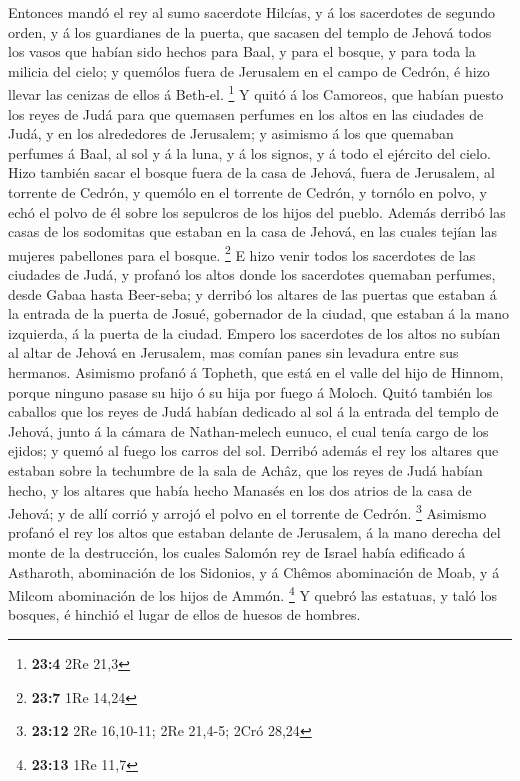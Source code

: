  Entonces mandó el rey al sumo sacerdote Hilcías, y á los
sacerdotes de segundo orden, y á los guardianes de la puerta, que
sacasen del templo de Jehová todos los vasos que habían sido hechos para
Baal, y para el bosque, y para toda la milicia del cielo; y quemólos
fuera de Jerusalem en el campo de Cedrón, é hizo llevar las cenizas de
ellos á Beth-el. \footnote{\textbf{23:4} 2Re 21,3}  Y
quitó á los Camoreos, que habían puesto los reyes de Judá para que
quemasen perfumes en los altos en las ciudades de Judá, y en los
alrededores de Jerusalem; y asimismo á los que quemaban perfumes á Baal,
al sol y á la luna, y á los signos, y á todo el ejército del cielo.
 Hizo también sacar el bosque fuera de la casa de Jehová,
fuera de Jerusalem, al torrente de Cedrón, y quemólo en el torrente de
Cedrón, y tornólo en polvo, y echó el polvo de él sobre los sepulcros de
los hijos del pueblo.  Además derribó las casas de los
sodomitas que estaban en la casa de Jehová, en las cuales tejían las
mujeres pabellones para el bosque. \footnote{\textbf{23:7} 1Re 14,24}
 E hizo venir todos los sacerdotes de las ciudades de
Judá, y profanó los altos donde los sacerdotes quemaban perfumes, desde
Gabaa hasta Beer-seba; y derribó los altares de las puertas que estaban
á la entrada de la puerta de Josué, gobernador de la ciudad, que estaban
á la mano izquierda, á la puerta de la ciudad.  Empero los
sacerdotes de los altos no subían al altar de Jehová en Jerusalem, mas
comían panes sin levadura entre sus hermanos.  Asimismo
profanó á Topheth, que está en el valle del hijo de Hinnom, porque
ninguno pasase su hijo ó su hija por fuego á Moloch. 
Quitó también los caballos que los reyes de Judá habían dedicado al sol
á la entrada del templo de Jehová, junto á la cámara de Nathan-melech
eunuco, el cual tenía cargo de los ejidos; y quemó al fuego los carros
del sol.  Derribó además el rey los altares que estaban
sobre la techumbre de la sala de Achâz, que los reyes de Judá habían
hecho, y los altares que había hecho Manasés en los dos atrios de la
casa de Jehová; y de allí corrió y arrojó el polvo en el torrente de
Cedrón. \footnote{\textbf{23:12} 2Re 16,10-11; 2Re 21,4-5; 2Cró 28,24}
 Asimismo profanó el rey los altos que estaban delante de
Jerusalem, á la mano derecha del monte de la destrucción, los cuales
Salomón rey de Israel había edificado á Astharoth, abominación de los
Sidonios, y á Chêmos abominación de Moab, y á Milcom abominación de los
hijos de Ammón. \footnote{\textbf{23:13} 1Re 11,7}  Y
quebró las estatuas, y taló los bosques, é hinchió el lugar de ellos de
huesos de hombres.

